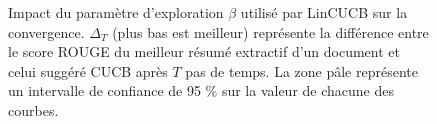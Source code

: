 \begin{figure}[ht!]
\begin{center}
    \end{center}
    \caption[Impact du paramètre d'exploration $\beta$ sur la convergence de LinCUCB avec intervalle de confiance de 95 \%]
    {Impact du paramètre d'exploration $\beta$ utilisé par LinCUCB sur la convergence.
    $\Delta_T$ (plus bas est meilleur) représente la différence entre le score ROUGE du meilleur résumé
    extractif d'un document et celui suggéré CUCB après $T$ pas de temps.
    La zone pâle représente un intervalle de confiance de 95 \% sur la valeur de chacune des courbes.}
\end{figure}

